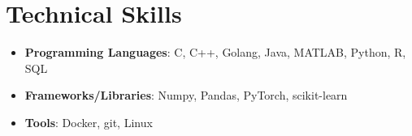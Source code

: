 \documentclass[letterpaper,11pt]{article}
\newcommand{\resumeItem}[2]{
	\item\small{
		\textbf{#1}{: #2 \vspace{-2pt}}
	}
}
\newcommand{\resumeSubItem}[2]{\resumeItem{#1}{#2}\vspace{-4pt}}
\newcommand{\resumeSubHeadingListStart}{\begin{itemize}[leftmargin=*]}
\newcommand{\resumeSubHeadingListEnd}{\end{itemize}}
\begin{document}
	\section{Technical Skills}
	\resumeSubHeadingListStart
	\resumeSubItem{Programming Languages}
	{C, C++, Golang, Java, MATLAB, Python, R, SQL}
	\resumeSubItem{Frameworks/Libraries}{Numpy, Pandas, PyTorch, scikit-learn}
	\resumeSubItem{Tools}{Docker, git, Linux}
	\resumeSubHeadingListEnd
\end{document}
